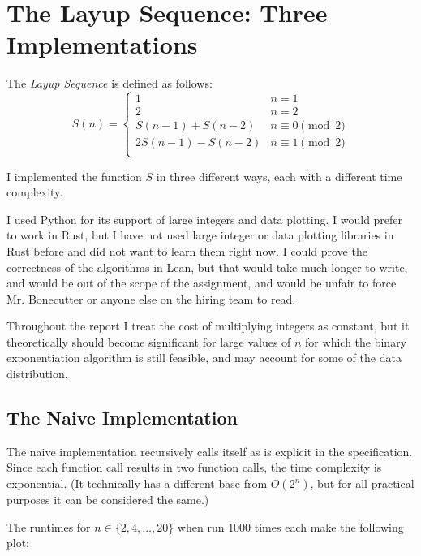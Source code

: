 \documentclass[12pt]{article}
\begin{document}
    \setlength{\parindent}{0pt}
    \setlength{\parskip}{5pt}
    \setlength{\headheight}{14.49999pt}
    \addtolength{\topmargin}{-1.59999pt}

    \section*{The Layup Sequence: Three Implementations}

    The \textit{Layup Sequence} is defined as follows:
    \[
        S(n) =
        \begin{cases}
            1 & n = 1 \\
            2 & n = 2 \\
            S(n - 1) + S(n - 2) & n \equiv 0 \pmod{2} \\
            2S(n - 1) - S(n - 2) & n \equiv 1 \pmod{2} \\
        \end{cases}
    \]

    I implemented the function $S$ in three different ways, each with a different time complexity.

    I used Python for its support of large integers and data plotting.
    I would prefer to work in Rust, but I have not used large integer or data plotting
    libraries in Rust before and did not want to learn them right now.
    I could prove the correctness of the algorithms in Lean, but that would
    take much longer to write, and would be out of the scope of the assignment,
    and would be unfair to force Mr. Bonecutter or anyone else on the hiring team to read.

    Throughout the report I treat the cost of multiplying integers as constant,
    but it theoretically should become significant for large values of $n$
    for which the binary exponentiation algorithm is still feasible,
    and may account for some of the data distribution.

    \subsection*{The Naive Implementation}

    The naive implementation recursively calls itself as is explicit in the specification.
    Since each function call results in two function calls,
    the time complexity is exponential.
    (It technically has a different base from $O(2^n)$,
    but for all practical purposes it can be considered the same.)

    The runtimes for $n \in \{2, 4, \dots, 20\}$
    when run $1000$ times each make the following plot:
\end{document}

